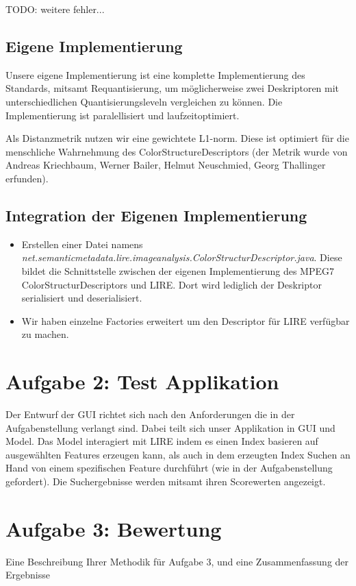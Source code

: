 \documentclass{article}
\newcommand{\mysection}[1]{\section*{#1} \setcounter{subsection}{0}}
\begin{document}
	
	TODO: weitere fehler...
    
  \subsection{Eigene Implementierung}
    Unsere eigene Implementierung ist eine komplette Implementierung des Standards, mitsamt Requantisierung, um möglicherweise zwei Deskriptoren mit unterschiedlichen Quantisierungsleveln vergleichen zu können. Die Implementierung ist paralellisiert und laufzeitoptimiert. 
    
    Als Distanzmetrik nutzen wir eine gewichtete L1-norm. Diese ist optimiert für die menschliche Wahrnehmung des ColorStructureDescriptors (der Metrik wurde von Andreas Kriechbaum, Werner Bailer, Helmut Neuschmied, Georg Thallinger erfunden).
  \subsection{Integration der Eigenen Implementierung}
    \begin{itemize}
      \item Erstellen einer Datei namens \emph{net.semanticmetadata.lire.imageanalysis.ColorStructurDescriptor.java}. Diese bildet die Schnittstelle zwischen der eigenen Implementierung des MPEG7 ColorStructurDescriptors und LIRE. Dort wird lediglich der Deskriptor serialisiert und deserialisiert.
      \item Wir haben einzelne Factories erweitert um den Descriptor für LIRE verfügbar zu machen.
    \end{itemize}

\mysection{Aufgabe 2: Test Applikation}
  Der Entwurf der GUI richtet sich nach den Anforderungen die in der Aufgabenstellung verlangt sind.
  Dabei teilt sich unser Applikation in GUI und Model. Das Model interagiert mit LIRE indem es einen
  Index basieren auf ausgewählten Features erzeugen kann, als auch in dem erzeugten Index Suchen an Hand von einem
  spezifischen Feature durchführt (wie in der Aufgabenstellung gefordert). Die Suchergebnisse werden mitsamt ihren Scorewerten angezeigt.
  
\mysection{Aufgabe 3: Bewertung}
Eine Beschreibung Ihrer Methodik für Aufgabe 3, und eine Zusammenfassung der Ergebnisse
\end{document}
